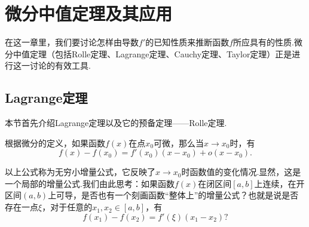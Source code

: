 \chapter{微分中值定理及其应用}
在这一章里，我们要讨论怎样由导数$f'$的已知性质来推断函数$f$所应具有的性质.微分中值定理（包括Rolle定理、Lagrange定理、Cauchy定理、Taylor定理）正是进行这一讨论的有效工具.
\section{Lagrange定理}
本节首先介绍Lagrange定理以及它的预备定理——Rolle定理.

根据微分的定义，如果函数$f(x)$在点$x_0$可微，那么当$x\to x_0$时，有
$$f(x)-f(x_0)=f'(x_0)(x-x_0)+o(x-x_0).$$

以上公式称为{\heiti 无穷小增量公式}，它反映了$x\to x_0$时函数值的变化情况.显然，这是一个局部的增量公式.我们由此思考：如果函数$f(x)$在闭区间$\left[a,b\right]$上连续，在开区间$(a,b)$上可导，是否也有一个刻画函数“整体上”的增量公式？也就是说是否存在一点$\xi$，对于任意的$x_1,x_2\in\left[a,b\right]$，有
$$f(x_1)-f(x_2)=f'(\xi)(x_1-x_2)?$$

